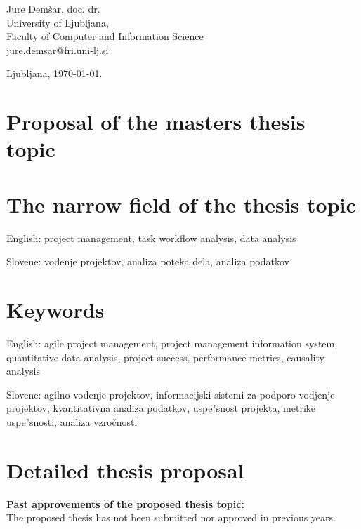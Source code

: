 \documentclass[a4paper, 12pt]{article}
\begin{document}
\hfill\begin{minipage}{\dimexpr\textwidth-2cm}
Jure Demšar, doc. dr. \\
University of Ljubljana, \\
Faculty of Computer and Information Science\\
\href{mailto:jure.demsar@fri.uni-lj.si}{jure.demsar@fri.uni-lj.si}
\end{minipage}

\bigskip

\hfill Ljubljana, \today.


\clearpage
\section*{Proposal of the masters thesis topic}

\section{The narrow field of the thesis topic}

English: project management, task workflow analysis, data analysis

Slovene: vodenje projektov, analiza poteka dela, analiza podatkov

\section{Keywords}

English: agile project management, project management information system, quantitative data analysis, project success, performance metrics, causality analysis

Slovene: agilno vodenje projektov, informacijski sistemi za podporo vodjenje projektov, kvantitativna analiza podatkov, uspe"snost projekta, metrike uspe"snosti, analiza vzročnosti

\section{Detailed thesis proposal}


\textbf{Past approvements of the proposed thesis topic:}\\
The proposed thesis has not been submitted nor approved in previous years.
\end{document}
